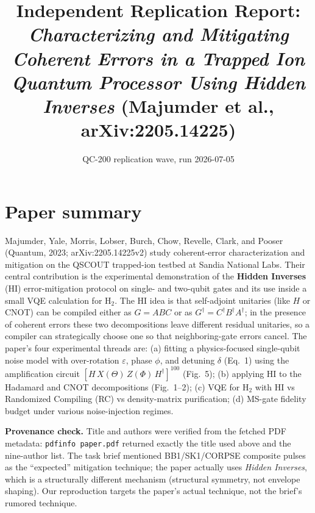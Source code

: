 \documentclass[11pt]{article}
\title{Independent Replication Report:\\
\emph{Characterizing and Mitigating Coherent Errors in a Trapped Ion Quantum Processor Using Hidden Inverses} (Majumder et al., arXiv:2205.14225)}
\author{QC-200 replication wave, run 2026-07-05}
\date{}
\begin{document}
\maketitle

\section{Paper summary}
Majumder, Yale, Morris, Lobser, Burch, Chow, Revelle, Clark, and Pooser (Quantum, 2023; arXiv:2205.14225v2) study coherent-error characterization and mitigation on the QSCOUT trapped-ion testbed at Sandia National Labs. Their central contribution is the experimental demonstration of the \textbf{Hidden Inverses} (HI) error-mitigation protocol on single- and two-qubit gates and its use inside a small VQE calculation for H$_2$.
The HI idea is that self-adjoint unitaries (like $H$ or CNOT) can be compiled either as $G=ABC$ or as $G^{\dagger}=C^{\dagger}B^{\dagger}A^{\dagger}$; in the presence of coherent errors these two decompositions leave different residual unitaries, so a compiler can strategically choose one so that neighboring-gate errors cancel.
The paper's four experimental threads are: (a) fitting a physics-focused single-qubit noise model with over-rotation $\varepsilon$, phase $\phi$, and detuning $\delta$ (Eq.~1) using the amplification circuit $[H\,X(\Theta)\,Z(\Phi)\,H^{\dagger}]^{100}$ (Fig.~5); (b) applying HI to the Hadamard and CNOT decompositions (Fig.~1--2); (c) VQE for H$_2$ with HI vs Randomized Compiling (RC) vs density-matrix purification; (d) MS-gate fidelity budget under various noise-injection regimes.

\medskip
\textbf{Provenance check.} Title and authors were verified from the fetched PDF metadata: \texttt{pdfinfo paper.pdf} returned exactly the title used above and the nine-author list. The task brief mentioned BB1/SK1/CORPSE composite pulses as the ``expected'' mitigation technique; the paper actually uses \emph{Hidden Inverses}, which is a structurally different mechanism (structural symmetry, not envelope shaping). Our reproduction targets the paper's actual technique, not the brief's rumored technique.
\end{document}

